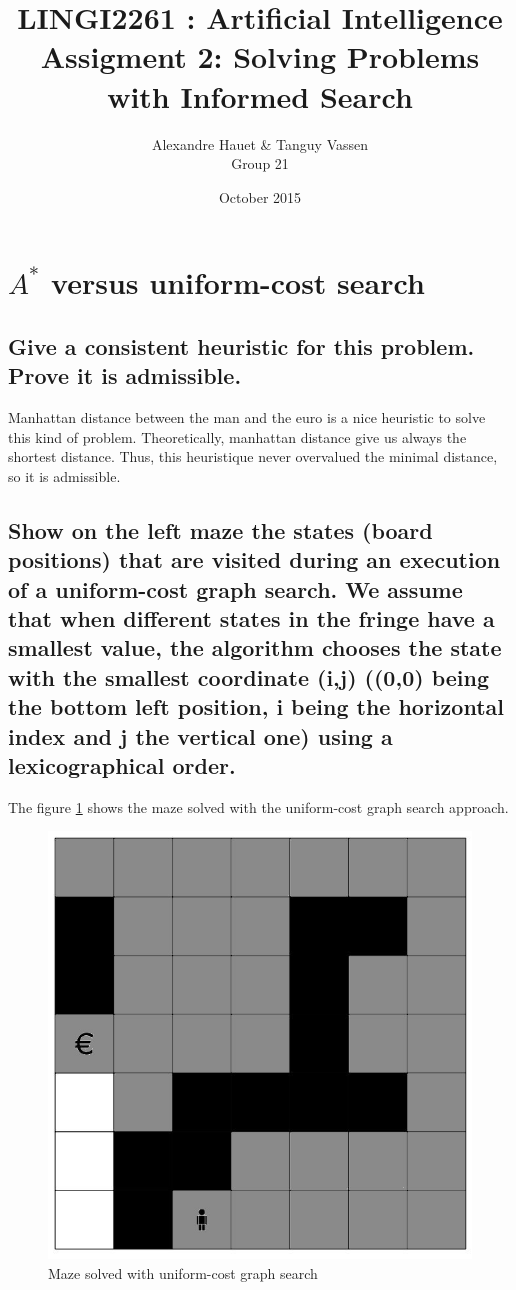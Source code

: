 \documentclass{article}
\title{LINGI2261 : Artificial Intelligence \\ Assigment 2: Solving Problems with Informed Search}
\author{Alexandre Hauet \& Tanguy Vassen \\ Group 21}
\date{October 2015}
\begin{document}
\maketitle


\section{$A^{*}$ versus uniform-cost search}

\subsection*{Give a consistent heuristic for this problem. Prove it is admissible.}
Manhattan distance between the man and the euro is a nice heuristic to solve this kind of problem. Theoretically, manhattan distance give us always the shortest distance. Thus, this heuristique never overvalued the minimal distance, so it is admissible.


\subsection*{Show on the left maze the states (board positions) that are visited during an execution of a uniform-cost graph search. We assume that when different states in the fringe have a smallest value, the algorithm chooses the state with the smallest coordinate (i,j) ((0,0) being the bottom left position, i being the horizontal index and j the vertical one) using a lexicographical order.}

The figure \ref{fig:uniform} shows the maze solved with the uniform-cost graph search approach.

\begin{figure}[!ht] %
 \centering
 \includegraphics[scale=0.4]{uniform.JPG} 
 \caption{Maze solved with uniform-cost graph search}
 \label{fig:uniform}
\end{figure}
\end{document}
